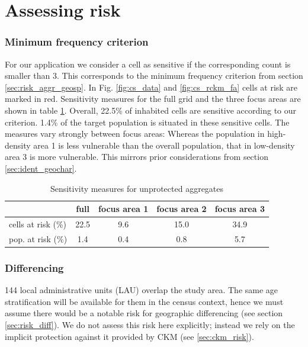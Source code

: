 \section{Assessing risk} \label{sec:csCKM_risk}

\subsubsection{Minimum frequency criterion}

For our application we consider a cell as sensitive if the corresponding count is smaller than 3. This corresponds to the minimum frequency criterion from section \ref{sec:risk_aggr_geosp}. In Fig. \ref{fig:cs_data} and \ref{fig:cs_rckm_fa} cells at risk are marked in red. Sensitivity measures for the full grid and the three focus areas are shown in table \ref{tab:cs_risk}. Overall, 22.5\% of inhabited cells are sensitive according to our criterion. 1.4\% of the target population is situated in these sensitive cells. The measures vary strongly between focus areas: Whereas the population in high-density area 1 is less vulnerable than the overall population, that in low-density area 3 is more vulnerable. This mirrors prior considerations from section \ref{sec:ident_geochar}.

\begin{table}[H]
    \centering
    \begin{tabular}{l c c c c}
         & full & focus area 1 & focus area 2 & focus area 3 \\
         \hline
         cells at risk (\%) & 22.5 & 9.6 & 15.0 & 34.9 \\
         pop. at risk (\%) & 1.4 & 0.4 & 0.8 & 5.7 \\
         \hline
    \end{tabular}
    \caption{Sensitivity measures for unprotected aggregates}
    \label{tab:cs_risk}
\end{table}

\subsubsection{Differencing}

144 local administrative units (LAU) overlap the study area. The same age stratification will be available for them in the census context, hence we
must assume there would be a notable risk for geographic differencing (see section \ref{sec:risk_diff}). We do not assess this risk 
here explicitly; instead we rely on the implicit protection against it provided by CKM (see \ref{sec:ckm_risk}).


